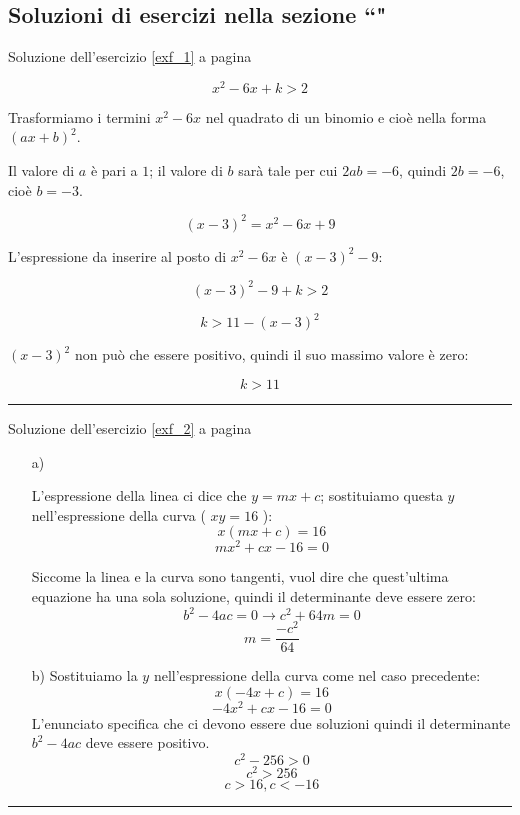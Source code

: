 
\subsection{Soluzioni di esercizi nella sezione ``\textbf{}"}

Soluzione dell'esercizio \ref{exf_1} a pagina \pageref{exf_1}\label{solf_1}

\[
x^2 - 6x + k > 2
\]

Trasformiamo i termini $x^2-6x$ nel quadrato di un binomio e cioè nella forma $(ax+b)^2$.

Il valore di $a$ è pari a $1$; il valore di $b$ sarà tale per cui $2ab=-6$, quindi $2b=-6$, cioè $b=-3$.

\[ (x-3)^2=x^2-6x+9 \]

L'espressione da inserire al posto di $x^2 - 6x$ è $(x-3)^2 -9$:

\[ (x-3)^2-9+k>2 \]

\[ k>11-(x-3)^2 \]

$(x-3)^2$ non può che essere positivo, quindi il suo massimo valore è zero:

\[k>11\]


\vspace{1cm}
\hrule
\vspace{1cm}

Soluzione dell'esercizio \ref{exf_2} a pagina \pageref{exf_2}\label{solf_2}
\vspace{0.5cm}
\begin{enumerate}
\item[a)]

L'espressione della linea ci dice che $y=mx+c$; sostituiamo questa $y$ nell'espressione
della curva ( $xy = 16$ ):
\[x(mx+c)=16\]
\[mx^2 +cx -16=0\]

Siccome la linea e la curva sono tangenti, vuol dire che quest'ultima equazione
ha una sola soluzione, quindi il determinante deve essere zero:
\[b^2-4ac=0 \rightarrow c^2+64m=0\]
\[m=\frac{-c^2}{64}\]


\item[b)]
Sostituiamo la $y$ nell'espressione della curva come nel caso precedente:
\[x(-4x+c)=16\]
\[-4x^2 +cx-16=0\]
L'enunciato specifica che ci devono essere due soluzioni quindi il determinante
$b^2-4ac$ deve essere positivo.
\[c^2-256>0\]
\[c^2>256\]
\[c>16, c<-16\]
\end{enumerate}

\vspace{1cm}
\hrule
\vspace{1cm}

